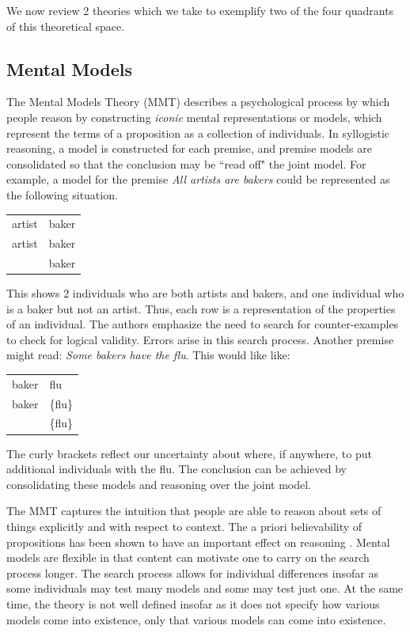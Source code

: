 \documentclass[10pt,letterpaper]{article}
\begin{document}
We now review 2 theories which we take to exemplify two of the four quadrants of this theoretical space. 

\subsection{Mental Models}
 The Mental Models Theory (MMT) describes a psychological process by which people reason by constructing {\em iconic} mental representations or models, which represent the terms of a proposition as a collection of individuals. In syllogistic reasoning, a model is constructed for each premise, and premise models are consolidated so that the conclusion may be ``read off" the joint model. For example, a model for the premise  \emph{All artists are bakers} could be represented as the following situation.

\begin{tabular}{l l}
artist & baker\\
artist & baker\\
 & baker\\
\end{tabular}

This shows 2 individuals who are both artists and bakers, and one individual who is a baker but not an artist. Thus, each row is a representation of the properties of an individual. The authors emphasize the need to search for counter-examples to check for logical validity. Errors arise in this search process. Another premise might read: \emph{Some bakers have the flu}. This would like like:

\begin{tabular}{l l}
baker & flu\\
baker & \{flu\}\\
 & \{flu\}\\
\end{tabular}

The curly brackets reflect our uncertainty about where, if anywhere, to put additional individuals with the flu. The conclusion can be achieved by consolidating these models and reasoning over the joint model.

The MMT captures the intuition that people are able to reason about sets of things explicitly and with respect to context.  The a priori believability of propositions has been shown to have an important effect on reasoning \cite{Oakhill1989}. Mental models are flexible in that content can motivate one to carry on the search process longer. The search process allows for individual differences insofar as some individuals may test many models and some may test just one. At the same time, the theory is not well defined insofar as it does not specify how various models come into existence, only that various models can come into existence.
\end{document}
